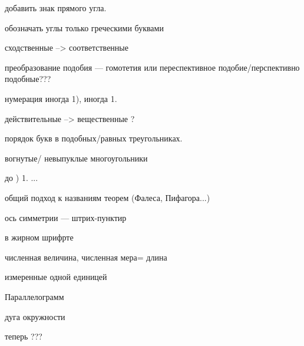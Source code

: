 





добавить знак прямого угла.

обозначать углы только греческими буквами



сходственные --> соответственные


преобразование подобия --- гомотетия или переспективное подобие/перспективно подобные???






нумерация иногда 1), иногда 1.

действительные --> вещественные ?


порядок букв в подобных/равных треугольниках.

вогнутые/ невыпуклые многоугольники 

\medskip до ) 1. ...

общий подход к названиям теорем (Фалеса, Пифагора...)

ось симметрии --- штрих-пунктир

\bm в жирном шрифрте

численная величина, численная мера= длина

измеренные одной единицей

Па\-ра\-лле\-ло\-грамм

дуга окружности

теперь ???